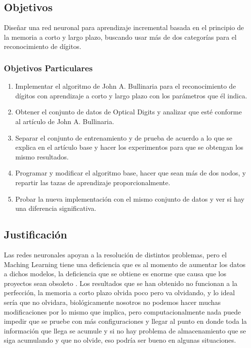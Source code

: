 \subsection{Objetivos}
Diseñar una red neuronal para aprendizaje incremental basada en el principio de la memoria a corto y largo plazo, buscando usar más de dos categorías para el reconocimiento de dígitos.
\subsubsection{Objetivos Particulares}
    \begin{enumerate}
        \item Implementar el algoritmo de John A. Bullinaria para el reconocimiento de dígitos con aprendizaje a corto y largo plazo con los parámetros que él indica.
        \item Obtener el conjunto de datos de Optical Digits y analizar que esté conforme al artículo de John A. Bullinaria.
        \item Separar el conjunto de entrenamiento y de prueba de acuerdo a lo que se explica en el artículo base y hacer los experimentos para que se obtengan los mismo resultados.
        \item Programar y modificar el algoritmo base, hacer que sean más de dos nodos, y repartir las tazas de aprendizaje proporcionalmente.
        \item Probar la nueva implementación con el mismo conjunto de datos y ver si hay una diferencia significativa.
    \end{enumerate}
\subsection{Justificaci\'on}

Las redes neuronales apoyan a la resoluci\'on de distintos problemas, pero el Maching Learning 
tiene una deficiencia que es al momento de aumentar los datos a dichos modelos, la deficiencia 
que se obtiene es enorme que causa que los proyectos sean obsoleto \cite{Bullinaria2009}. Los 
resultados que se han obtenido no funcionan a la perfección, la memoria a corto plazo olvida poco 
pero va olvidando, y lo ideal sería que no olvidara, biológicamente nosotros no podemos 
hacer muchas modificaciones por lo mismo que implica, pero computacionalmente nada puede 
impedir que se pruebe con más configuraciones y llegar al punto en donde toda la información 
que llega se acumule y si no hay problema de almacenamiento que se siga acumulando y que no olvide, 
eso podría ser bueno en algunas situaciones.

